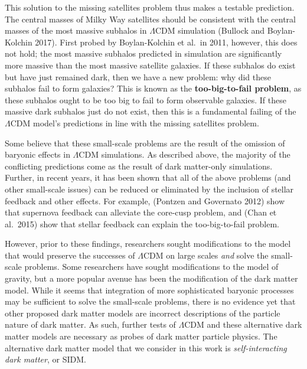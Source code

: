 This solution to the missing satellites problem thus makes a testable
prediction. The central masses of Milky Way satellites should be
consistent with the central masses of the most massive subhalos in
\(\Lambda\)CDM simulation (Bullock and Boylan-Kolchin 2017). First
probed by Boylan-Kolchin et al.~in 2011, however, this does not hold;
the most massive subhalos predicted in simulation are significantly more
massive than the most massive satellite galaxies. If these subhalos do
exist but have just remained dark, then we have a new problem: why did
these subhalos fail to form galaxies? This is known as the
\textbf{too-big-to-fail problem}, as these subhalos ought to be too big
to fail to form observable galaxies. If these massive dark subhalos just
do not exist, then this is a fundamental failing of the \(\Lambda\)CDM
model's predictions in line with the missing satellites problem.

Some believe that these small-scale problems are the result of the
omission of baryonic effects in \(\Lambda\)CDM simulations. As described
above, the majority of the conflicting predictions come as the result of
dark matter-only simulations. Further, in recent years, it has been
shown that all of the above problems (and other small-scale issues) can
be reduced or eliminated by the inclusion of stellar feedback and other
effects. For example, (Pontzen and Governato 2012) show that supernova
feedback can alleviate the core-cusp problem, and (Chan et al.~2015)
show that stellar feedback can explain the too-big-to-fail problem.

However, prior to these findings, researchers sought modifications to
the model that would preserve the successes of \(\Lambda\)CDM on large
scales \emph{and} solve the small-scale problems. Some researchers have
sought modifications to the model of gravity, but a more popular avenue
has been the modification of the dark matter model. While it seems that
integration of more sophisticated baryonic processes may be sufficient
to solve the small-scale problems, there is no evidence yet that other
proposed dark matter models are incorrect descriptions of the particle
nature of dark matter. As such, further tests of \(\Lambda\)CDM and
these alternative dark matter models are necessary as probes of dark
matter particle physics. The alternative dark matter model that we
consider in this work is \emph{self-interacting dark matter}, or SIDM.
